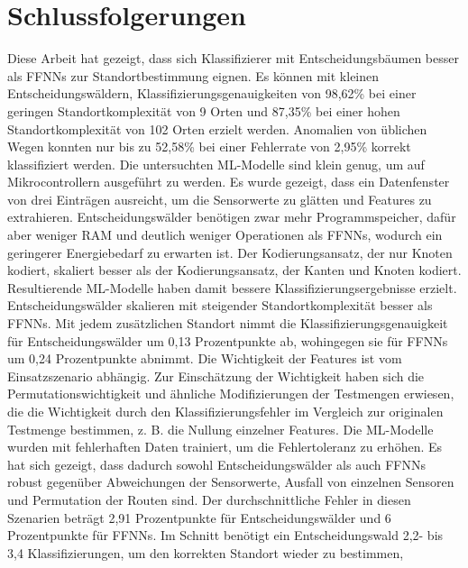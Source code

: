 \chapter{Schlussfolgerungen}
Diese Arbeit hat gezeigt, dass sich Klassifizierer mit Entscheidungsbäumen besser als FFNNs zur Standortbestimmung eignen.
Es können mit kleinen Entscheidungswäldern, Klassifizierungsgenauigkeiten von 98,62\% bei einer geringen Standortkomplexität von 9 Orten
und 87,35\% bei einer hohen Standortkomplexität von 102 Orten erzielt werden.
Anomalien von üblichen Wegen konnten nur bis zu 52,58\% bei einer Fehlerrate von 2,95\% korrekt klassifiziert werden.
\newline
\newline
Die untersuchten ML-Modelle sind klein genug, um auf Mikrocontrollern ausgeführt zu werden.
Es wurde gezeigt, dass ein Datenfenster von drei Einträgen ausreicht, um die Sensorwerte zu glätten und Features zu extrahieren.
Entscheidungswälder benötigen zwar mehr Programmspeicher, dafür aber weniger RAM und deutlich weniger Operationen als FFNNs, wodurch
ein geringerer Energiebedarf zu erwarten ist.
\newline
\newline
Der Kodierungsansatz, der nur Knoten kodiert, skaliert besser als der Kodierungsansatz, der Kanten und Knoten kodiert.
Resultierende ML-Modelle haben damit bessere Klassifizierungsergebnisse erzielt.
Entscheidungswälder skalieren mit steigender Standortkomplexität besser als FFNNs.
Mit jedem zusätzlichen Standort nimmt die Klassifizierungsgenauigkeit für Entscheidungswälder um 0,13 Prozentpunkte ab,
wohingegen sie für FFNNs um 0,24 Prozentpunkte abnimmt.
\newline
\newline
Die Wichtigkeit der Features ist vom Einsatzszenario abhängig.
Zur Einschätzung der Wichtigkeit haben sich die Permutationswichtigkeit \cite{breiman2001random} und ähnliche Modifizierungen der Testmengen erwiesen,
die die Wichtigkeit durch den Klassifizierungsfehler im Vergleich zur originalen Testmenge bestimmen, z. B. die Nullung einzelner Features.
\newpage
Die ML-Modelle wurden mit fehlerhaften Daten trainiert, um die Fehlertoleranz zu erhöhen.
Es hat sich gezeigt, dass dadurch sowohl Entscheidungswälder als auch FFNNs robust gegenüber Abweichungen der Sensorwerte,
Ausfall von einzelnen Sensoren und Permutation der Routen sind.
Der durchschnittliche Fehler in diesen Szenarien beträgt 2,91 Prozentpunkte für Entscheidungswälder und 6 Prozentpunkte für FFNNs.
Im Schnitt benötigt ein Entscheidungswald 2,2- bis 3,4 Klassifizierungen, um den korrekten Standort wieder zu bestimmen,
